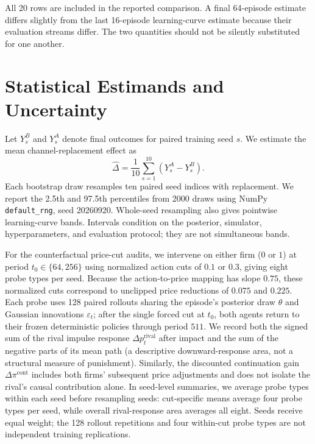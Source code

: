 \documentclass{article}
\begin{document}
All 20 rows are included in the reported comparison. A final 64-episode estimate differs slightly from the last 16-episode learning-curve estimate because their evaluation streams differ. The two quantities should not be silently substituted for one another.

\section{Statistical Estimands and Uncertainty}

Let $Y_s^B$ and $Y_s^A$ denote final outcomes for paired training seed $s$. We estimate the mean channel-replacement effect as
\[
\hat{\Delta} = \frac{1}{10}\sum_{s=1}^{10}(Y_s^A - Y_s^B).
\]
Each bootstrap draw resamples ten paired seed indices with replacement. We report the 2.5th and 97.5th percentiles from \num{2000} draws using NumPy \texttt{default\_rng}, seed 20260920. Whole-seed resampling also gives pointwise learning-curve bands. Intervals condition on the posterior, simulator, hyperparameters, and evaluation protocol; they are not simultaneous bands.

For the counterfactual price-cut audits, we intervene on either firm ($0$ or $1$) at period $t_0\in\{64, 256\}$ using normalized action cuts of $0.1$ or $0.3$, giving eight probe types per seed. Because the action-to-price mapping has slope $0.75$, these normalized cuts correspond to unclipped price reductions of $0.075$ and $0.225$. Each probe uses 128 paired rollouts sharing the episode's posterior draw $\theta$ and Gaussian innovations $\varepsilon_t$; after the single forced cut at $t_0$, both agents return to their frozen deterministic policies through period $511$. We record both the signed sum of the rival impulse response $\Delta p_t^{\mathrm{rival}}$ after impact and the sum of the negative parts of its mean path (a descriptive downward-response area, not a structural measure of punishment). Similarly, the discounted continuation gain $\Delta\pi^{\mathrm{cont}}$ includes both firms' subsequent price adjustments and does not isolate the rival's causal contribution alone. In seed-level summaries, we average probe types within each seed before resampling seeds: cut-specific means average four probe types per seed, while overall rival-response area averages all eight. Seeds receive equal weight; the 128 rollout repetitions and four within-cut probe types are not independent training replications.
\end{document}
